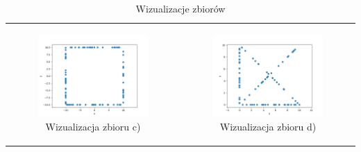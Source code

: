\documentclass[a4paper]{article}
\begin{document}
\begin{table}[H]
\begin{tabular}{cc}
        \begin{subfigure}{0.5\textwidth}
            \includegraphics[width=\columnwidth]{points_c.png}
            \caption{Wizualizacja zbioru c)}
            \label{fig:points_c}
        \end{subfigure} & 
        \begin{subfigure}{0.5\textwidth}
            \includegraphics[width=\columnwidth]{points_d.png}
            \caption{Wizualizacja zbioru d)}
            \label{fig:points_d}
        \end{subfigure} \\
    
    \end{tabular}
    \caption{Wizualizacje zbiorów}
\end{table}
\end{document}
